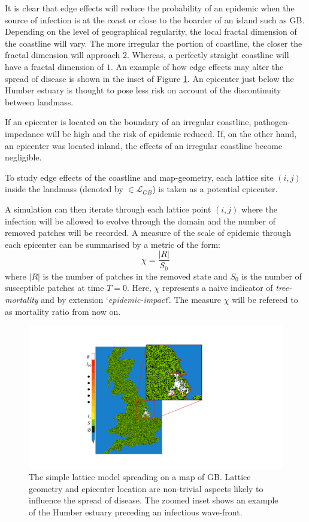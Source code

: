 It is clear that edge effects will reduce the probability of an epidemic when the source %
of infection is at the coast or close to the boarder of an island such as GB. %
Depending on the level of geographical %
regularity, the local fractal dimension of the coastline will vary. %
The more irregular the portion of coastline, the closer the fractal dimension will approach $2$. %
Whereas, a perfectly straight coastline will have a fractal dimension of $1$. An example of %
how edge effects may alter the spread of disease is shown in the inset of Figure \ref{fig:uk-spread-primer}. %
An epicenter just below the Humber estuary is thought to pose less risk on account of the discontinuity between landmass. %

If an epicenter is located on the boundary of an irregular coastline, pathogen-impedance %
will be high and the risk of epidemic reduced. If, on the other hand, an epicenter was located inland, %
the effects of an irregular coastline become negligible. %

To study  edge effects of the coastline and map-geometry, each lattice site $(i, j)$ inside %
the landmass (denoted by $\in \mathcal{L}_{GB}$) is taken as a potential epicenter. %

A simulation can then iterate through each lattice point $(i,j)$ where the infection will be %
allowed to evolve through the domain and the number of removed patches will be recorded. %
A measure of the scale of epidemic through each epicenter can be summarised by a metric of the form: %
\begin{equation}
\label{eq:epi_impact}
    \chi=\frac{|R|}{S_0}
\end{equation}
where $|R|$ is the number of patches in the removed state and $S_0$ is the number of susceptible %
patches at time $T=0$. Here, $\chi$ represents a naive indicator of \textit{tree-mortality} %
and by extension `\textit{epidemic-impact}'. The measure $\chi$ will be refereed to as mortality %
ratio from now on. %

\begin{figure}
    \centering
    \includegraphics[scale=0.3]{chapter4/figures/figure1.pdf}
    \caption{The simple lattice model spreading on a map of GB. Lattice geometry and epicenter %
    location are non-trivial aspects likely to influence the spread of disease. The zoomed inset %
    shows an example of the Humber estuary preceding an infectious wave-front. }
    \label{fig:uk-spread-primer}
\end{figure}

